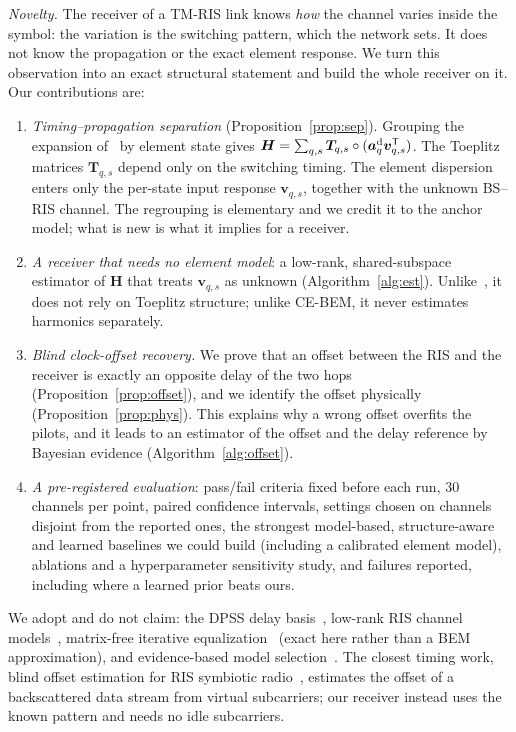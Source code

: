 \documentclass[conference,10pt]{IEEEtran}
\theoremstyle{remark}
\newcommand{\T}{\mathsf T}
\begin{document}
\emph{Novelty.} The receiver of a TM-RIS link knows \emph{how} the channel varies inside the symbol: the variation is
the switching pattern, which the network sets. It does not know the propagation or the exact element response. We turn
this observation into an exact structural statement and build the whole receiver on it. Our contributions are:
\begin{enumerate}
\item \emph{Timing--propagation separation} (Proposition~\ref{prop:sep}). Grouping the expansion of~\cite[eq.~(5)]{iudice2026}
by element state gives $\bm H=\sum_{q,s}\bm T_{q,s}\circ(\bm a^{\rm d}_q\bm v_{q,s}^{\T})$. The Toeplitz matrices
$\bm T_{q,s}$ depend only on the switching timing. The element dispersion enters only the per-state input response
$\bm v_{q,s}$, together with the unknown BS--RIS channel. The regrouping is elementary and we credit it to the anchor
model; what is new is what it implies for a receiver.
\item \emph{A receiver that needs no element model}: a low-rank, shared-subspace estimator of $\bm H$ that treats
$\bm v_{q,s}$ as unknown (Algorithm~\ref{alg:est}). Unlike~\cite{tao2025secure}, it does not rely on Toeplitz structure;
unlike CE-BEM, it never estimates harmonics separately.
\item \emph{Blind clock-offset recovery.} We prove that an offset between the RIS and the receiver is exactly an
opposite delay of the two hops (Proposition~\ref{prop:offset}), and we identify the offset physically
(Proposition~\ref{prop:phys}). This explains why a wrong offset overfits the pilots, and it leads to an estimator of the
offset and the delay reference by Bayesian evidence (Algorithm~\ref{alg:offset}).
\item \emph{A pre-registered evaluation}: pass/fail criteria fixed before each run, 30 channels per point, paired
confidence intervals, settings chosen on channels disjoint from the reported ones, the strongest model-based,
structure-aware and learned baselines we could build (including a calibrated element model), ablations and a
hyperparameter sensitivity study, and failures reported, including where a learned prior beats ours.
\end{enumerate}
We adopt and do not claim: the DPSS delay basis~\cite{slepian1978,zemen2005}, low-rank RIS channel
models~\cite{wang2020compressed}, matrix-free iterative equalization~\cite{hrycak2010} (exact here rather than a BEM
approximation), and evidence-based model selection~\cite{mackay1992}. The closest timing work, blind offset estimation
for RIS symbiotic radio~\cite{chen2024sr}, estimates the offset of a backscattered data stream from virtual subcarriers;
our receiver instead uses the known pattern and needs no idle subcarriers.
\end{document}
